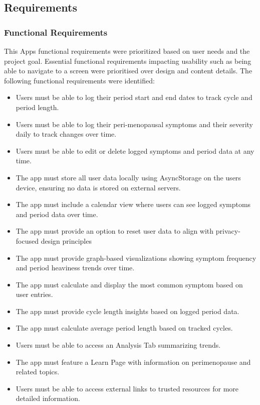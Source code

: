 \subsection{Requirements}

\subsubsection{Functional Requirements}
This Apps functional requirements were prioritized based on user needs and the project goal. Essential functional requirements impacting usability such as being able to navigate to a screen were prioritised over design and content details. The following functional requirements were identified:

\begin{itemize}
      \item Users must be able to log their period start and end dates to track cycle and period length.
      \item Users must be able to log their peri-menopausal symptoms and their severity daily to track changes over time.
      \item Users must be able to edit or delete logged symptoms and period data at any time.
      \item The app must store all user data locally using AsyncStorage on the users device, ensuring no data is stored on external servers.
      \item The app must include a calendar view where users can see logged symptoms and period data over time.
      \item The app must provide an option to reset user data to align with privacy-focused design principles
      \item The app must provide graph-based visualizations showing symptom frequency and period heaviness trends over time.
      \item The app must calculate and display the most common symptom based on user entries.
      \item The app must provide cycle length insights based on logged period data.
      \item The app must calculate average period length based on tracked cycles.
      \item Users must be able to access an Analysis Tab summarizing trends.
      \item The app must feature a Learn Page with information on perimenopause and related topics.
      \item Users must be able to access external links to trusted resources for more detailed information.

\end{itemize}
